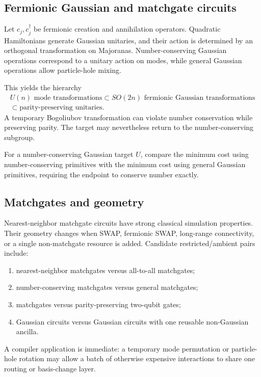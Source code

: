 \subsection{Fermionic Gaussian and matchgate circuits}
Let $c_j,c_j^\dagger$ be fermionic creation and annihilation operators.  Quadratic Hamiltonians generate Gaussian unitaries, and their action is determined by an orthogonal transformation on Majoranas.  Number-conserving Gaussian operations correspond to a unitary action on modes, while general Gaussian operations allow particle-hole mixing.

This yields the hierarchy
\[
\begin{gathered}
U(n)\text{ mode transformations}
\subset SO(2n)\text{ fermionic Gaussian transformations}\\
\subset \text{parity-preserving unitaries}.
\end{gathered}
\]
A temporary Bogoliubov transformation can violate number conservation while preserving parity.  The target may nevertheless return to the number-conserving subgroup.

\begin{definition}
For a number-conserving Gaussian target $U$, compare the minimum cost using number-conserving primitives with the minimum cost using general Gaussian primitives, requiring the endpoint to conserve number exactly.
\end{definition}

\subsection{Matchgates and geometry}
Nearest-neighbor matchgate circuits \cite{s:Valiant2002,s:JozsaMiyake2008} have strong classical simulation properties.  Their geometry changes when SWAP, fermionic SWAP, long-range connectivity, or a single non-matchgate resource is added.  Candidate restricted/ambient pairs include:
\begin{enumerate}
\item nearest-neighbor matchgates versus all-to-all matchgates;
\item number-conserving matchgates versus general matchgates;
\item matchgates versus parity-preserving two-qubit gates;
\item Gaussian circuits versus Gaussian circuits with one reusable non-Gaussian ancilla.
\end{enumerate}

A compiler application is immediate: a temporary mode permutation or particle-hole rotation may allow a batch of otherwise expensive interactions to share one routing or basis-change layer.


